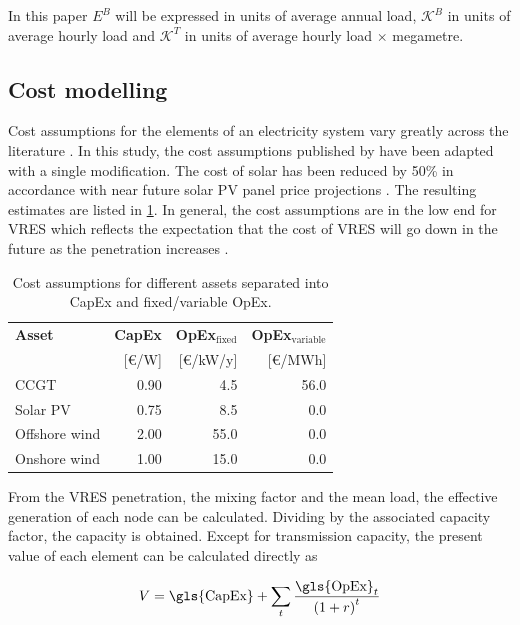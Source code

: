 \documentclass[a4paper, 5p, sort&compress]{elsarticle}%
\newcommand{\paren}[1]{\left(#1\right)}
\begin{document}
In this paper $E^{B}$ will be expressed in units of average annual
load, $\mathcal{K}^{B}$ in units of average hourly load and
$\mathcal{K}^{T}$ in units of average hourly load $\times$ megametre.

\subsection{Cost modelling}
\label{sec:cost-modelling}

Cost assumptions for the elements of an electricity system vary
greatly across the literature \cite{Sensitivity}. In this study, the
cost assumptions published by \cite{Rolando} have been adapted with a
single modification. The cost of solar has been reduced by 50\% in
accordance with near future solar PV panel price projections
\cite{irena}. The resulting estimates are listed in
\cref{tab:cost-assumptions}. In general, the cost assumptions are in
the low end for VRES which reflects the expectation that the cost of
VRES will go down in the future as the penetration increases
\cite{Fraunhofer}.

\begin{table}[h!]
  \centering
  \caption{Cost assumptions for different assets separated into
    \gls{CapEx} and fixed/variable \gls{OpEx}.}
  \label{tab:cost-assumptions}
  \begin{tabular}{lrrr}  \toprule
    \textbf{Asset} & \textbf{\gls{CapEx} }& \textbf{\gls{OpEx}$_{\text{fixed}}$} & \textbf{\gls{OpEx}$_{\text{variable}}$}\\
    & [\euro/W] & [\euro/kW/y] & [\euro/MWh]\\ \midrule
    CCGT & 0.90 & 4.5 & 56.0\\
    Solar PV & 0.75 & 8.5 & 0.0\\
    Offshore wind & 2.00 & 55.0 & 0.0\\
    Onshore wind & 1.00 & 15.0 & 0.0\\
    \bottomrule
  \end{tabular}
\end{table}

From the VRES penetration, the mixing factor and the mean load, the
effective generation of each node can be calculated. Dividing by the
associated capacity factor, the capacity is obtained. Except for
transmission capacity, the present value of each element can be
calculated directly as

\begin{equation}
  \label{eq:6}
  V = \text{\gls{CapEx}} + \sum_{t} \frac{\text{\gls{OpEx}}_{t}}{\paren{1 + r}^{t}}
\end{equation}
\end{document}
